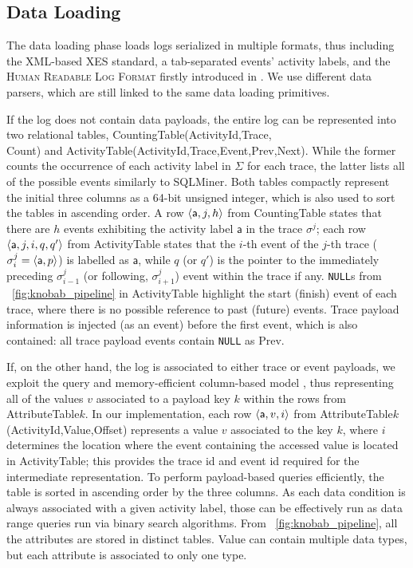 \subsection{Data Loading}\label{ssec:dl}
The data loading phase   loads logs  serialized in multiple  formats, thus including the XML-based XES standard, a tab-separated events' activity labels, and the \textsc{Human Readable Log Format} firstly introduced in \cite{bpm21}. We use different data parsers, which are still linked to the same data loading primitives. 

If the log does not contain data payloads, the entire log can be represented into two relational tables, \textsf{CountingTable(ActivityId,Trace,\\Count)} and \textsf{ActivityTable(ActivityId,Trace,Event,Prev,Next)}. While the former counts the occurrence of each activity label in $\Sigma$ for each trace, the latter lists all of the possible events similarly to SQLMiner. Both tables compactly represent the initial three columns as a 64-bit unsigned integer, which is also used to sort the tables in ascending order. A row $\braket{\textsf{a},j,h}$ from \textsf{CountingTable} states that there are $h$ events exhibiting the activity label $\textsf{a}$ in the trace $\sigma^j$; each row $\braket{\textsf{a},j,i,q,q'}$ from \textsf{ActivityTable} states that the $i$-th event of the $j$-th trace ($\sigma^j_i=\braket{\textsf{a},p}$) is labelled as $\textsf{a}$, while $q$ (or $q'$) is the pointer to the immediately preceding $\sigma^j_{i-1}$ (or  following, $\sigma^j_{i+1}$) event within the trace if any. \texttt{NULL}s from  \figurename~\ref{fig:knobab_pipeline} in \textsf{ActivityTable} highlight the start (finish) event of each trace, where there is no possible reference to past (future) events. Trace payload information is injected (as an event) before the first event, which is also contained:  all trace payload events contain \texttt{NULL} as \textsf{Prev}. %


If, on the other hand, the log is associated to either trace or event payloads, we exploit 
the query and memory-efficient  column-based model \cite{IdreosGNMMK12}, thus representing all of the values $v$ associated to a  payload key $k$ within the rows from  \textsf{AttributeTable$k$}. In our implementation, each row $\braket{\textsf{a},v,i}$ from  \textsf{AttributeTable$k$(ActivityId,Value,Offset)} represents a value $v$ associated to the key $k$, where $i$ determines the location where the event containing the accessed value is located in \textsf{ActivityTable}; this %
provides the trace id and event id required for the intermediate representation.
 To perform payload-based queries efficiently, the table is sorted in ascending order by the  three columns. As each data condition is always associated with a given activity label, those can be effectively run as data range queries run via binary search algorithms. From \figurename~\ref{fig:knobab_pipeline}, all the attributes are stored in distinct tables. \textsf{{Value}} can contain multiple data types, but each attribute is associated to only one type. %

